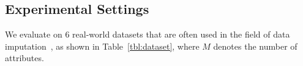 \subsection{Experimental Settings}

 We evaluate on 6 real-world datasets that are often used in the field of data imputation~\cite{DBLP:conf/icde/LiRBZCZ21, liu2021adaptive, DBLP:journals/pvldb/KrishnanWWFG16,DBLP:journals/pvldb/KarlasLWGC0020}, as shown in Table~\ref{tbl:dataset}, where $M$ denotes the number of attributes.   


